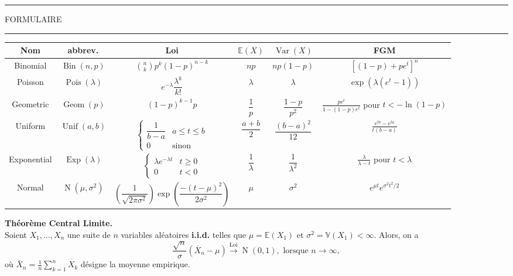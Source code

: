 \documentclass[11pt, addpoints, answers]{exam}
\def\Bin{\operatorname{Bin}}
\def\Var{\operatorname{Var}}
\def\Geom{\operatorname{Geom}}
\def\Pois{\operatorname{Pois}}
\def\Exp{\operatorname{Exp}}
\def\Unif{\operatorname{Unif}}
\def\No{\operatorname{N}}
\newcommand{\E}{\mathbb E}            %
\def\Var{\operatorname{Var}}
\begin{document}
\newpage
\hrule
\vspace*{.15in}
\begin{center}
  \large\MakeUppercase{Formulaire}
\end{center}
\vspace*{.15in}
\hrule
\vspace*{.25in}

\renewcommand\arraystretch{3.5}
\begin{table}[H]
\begin{center}
\footnotesize
\begin{tabular}{|c|c|c|c|c|c|}

\hline
Nom & abbrev. & Loi & $\E(X)$ & $\Var(X)$ & FGM\\
\hline\hline
Binomial & $\Bin(n,p)$ & $\binom{n}{k}p^k(1-p)^{n-k}$ & $np$ & $np(1-p)$ & $[(1-p)+pe^t]^n$\\
\hline
Poisson & $\Pois(\lambda)$ & $e^{-\lambda}\dfrac{\lambda^k}{k!}$ & $\lambda$ & $\lambda$ &$ \exp(\lambda(e^t-1))$\\
\hline
Geometric & $\Geom(p)$ & $(1-p)^{k-1}p$ & $\dfrac{1}{p}$ & $\dfrac{1-p}{p^2}$ & $\frac{pe^t}{1-(1-p)e^t}$ pour  $t<-\ln(1-p)$\\
\hline
Uniform & $\Unif(a,b)$ & $\begin{cases} \dfrac{1}{b-a} & a\leq t\leq b\\ 0 & \text{sinon}\end{cases}
$ & $\dfrac{a+b}{2}$ & $\dfrac{(b-a)^2}{12}$ & $\frac{e^{tb}-e^{ta}}{t(b-a)}$\\
\hline
Exponential & $\Exp(\lambda)$ & $\begin{cases} \lambda e^{-\lambda t} & t\geq 0 \\ 0 & t<0\end{cases}$ & $\dfrac{1}{\lambda}$ & $\dfrac{1}{\lambda^2}$ & $\frac{\lambda}{\lambda -t}$ pour $t<\lambda$\\
\hline
Normal & $\No(\mu,\sigma^2)$ & $\left(\dfrac{1}{\sqrt{2\pi\sigma^2}}\right)\operatorname{exp}{\left(\dfrac{-(t-\mu)^2}{2\sigma^2}\right)}$ & $\mu$ & $\sigma^2$ & $e^{\mu t}e^{\sigma^2t^2/2}$\\
\hline
\end{tabular}
\end{center}
\end{table}%

\textbf{Théorème Central Limite.}\\
Soient $X_1,\ldots,X_n$ une suite de $n$ variables aléatoires \textbf{i.i.d.} telles que $\mu =\mathbb{E}(X_1)$ et $\sigma^{2} =\mathbb{V}(X_1)<\infty$. Alors, on a
$$
\frac{\sqrt{n}}{\sigma}(\bar{X}_n-\mu)\overset{\text{Loi}}{\rightarrow}\No(0,1),\text{ lorsque }n\rightarrow\infty,
$$
où $\bar{X}_n=\frac{1}{n}\sum_{k=1}^{n}X_k$ désigne la moyenne empirique.
\end{document}
